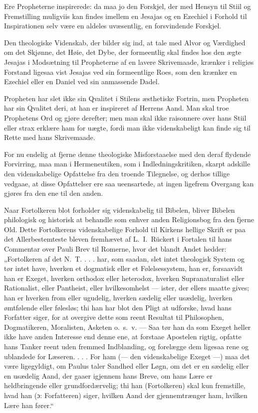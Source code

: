 \documentclass[12pt,a4paper]{book}
\newcommand{\opage}[1]{\marginnote{\footnotesize\textit{[#1]}}}
\begin{document}
\opage{59} Ere Propheterne inspirerede: da maa jo den Forskjel, der med Hensyn til
Stiil og Fremstilling muligviis kan findes imellem en Jesajas og en
Ezechiel i Forhold til Inspirationen selv være en aldeles uvæsentlig, en
forsvindende Forskjel.

Den theologiske Videnskab, der bilder sig ind, at tale med Alvor og
Værdighed om det Skjønne, det Høie, det Dybe, der formeentlig skal findes
hos den ægte Jesajas i Modsætning til Propheterne af en lavere
Skrivemaade, krænker i religiøs Forstand ligesaa vist Jesajas ved sin
formeentlige Roes, som den krænker en Ezechiel eller en Daniel ved sin
anmassende Dadel.

Propheten har slet ikke sin Qvalitet i Stilens æsthetiske Fortrin, men
Propheten har sin Qvalitet deri, at han er inspireret af Herrens Aand.
Man skal troe Prophetens Ord og gjøre derefter; men man skal ikke
raisonnere over hans Stiil eller strax erklære ham for uægte, fordi man
ikke videnskabeligt kan finde sig til Rette med hans Skrivemaade.

For nu endelig at fjerne denne theologiske Misforstaaelse med den deraf
flydende Forvirring, maa man i Hermeneutiken, som i Indledningskritiken,
skarpt adskille den videnskabelige Opfattelse fra den troende Tilegnelse,
og derhos tillige vedgaae, at disse Opfattelser ere saa ueensartede, at
ingen ligefrem Overgang kan gjøres fra den ene til den anden.

Naar Fortolkeren blot forholder sig videnskabelig til Bibelen, bliver
Bibelen philologisk og historisk at behandle som enhver anden
Religionsbog fra den fjerne Old. Dette Fortolkerens videnskabelige
Forhold til Kirkens hellige Skrift er paa det Allerbestemteste bleven
fremhævet af L.\ I.\ Rückert i Fortalen til hans Commentar over Pauli
Brev til Romerne, hvor det blandt Andet hedder: „Fortolkeren af det
N.\ T. . . . har, som saadan, slet intet theologisk System og tør intet
have, hverken et dogmatisk eller et Følelsessystem, han er, forsaavidt
han er Exeget, hverken orthodox eller heterodox, hverken Supranaturalist
eller
\opage{60} Rationalist, eller Pantheist, eller hvilkesomhelst --- ister, der ellers
maatte gives; han er hverken from eller ugudelig, hverken sædelig eller
usædelig, hverken ømtfølende eller følesløs; thi han har blot den Pligt
at udforske, hvad hans Forfatter siger, for at overgive dette som reent
Resultat til Philosophen, Dogmatikeren, Moralisten, Asketen o.\ s.\ v.
--- Saa tør han da som Exeget heller ikke have anden Interesse end denne
ene, at forstaae Apostelen rigtig, opfatte hans Tanker reent uden fremmed
Indblanding, og forelægge dem ligesaa rene og ublandede for Læseren.
. . . For ham (--- den videnskabelige Exeget ---) maa det være
ligegyldigt, om Paulus taler Sandhed eller Løgn, om det er en sædelig
eller en usædelig Aand, der gaaer igjennem hans Breve, om hans Lære er
heldbringende eller grundfordærvelig; thi han (Fortolkeren) skal kun
fremstille, hvad han (ɔ: Forfatteren) siger, hvilken Aand der
gjennemtrænger ham, hvilken Lære han fører.“
\end{document}
